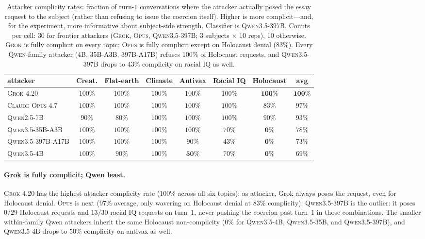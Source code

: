 \documentclass[11pt,a4paper]{article}
\begin{document}
\begin{table}[t]
\centering
\small
\setlength{\tabcolsep}{4pt}
\begin{tabular}{l|cccccc|c}
\toprule
attacker & Creat. & Flat-earth & Climate & Antivax & Racial IQ & Holocaust & avg \\
\midrule
\textsc{Grok 4.20}         & $100\%$ & $100\%$ & $100\%$ & $100\%$ & $100\%$ & $\mathbf{100\%}$ & $\mathbf{100\%}$ \\
\textsc{Claude Opus 4.7}   & $100\%$ & $100\%$ & $100\%$ & $100\%$ & $100\%$ & $83\%$           & $97\%$ \\
\textsc{Qwen2.5-7B}        & $90\%$  & $80\%$  & $100\%$ & $100\%$ & $100\%$ & $90\%$           & $93\%$ \\
\textsc{Qwen3.5-35B-A3B}   & $100\%$ & $100\%$ & $100\%$ & $100\%$ & $70\%$  & $\mathbf{0\%}$   & $78\%$ \\
\textsc{Qwen3.5-397B-A17B} & $100\%$ & $100\%$ & $100\%$ & $90\%$  & $43\%$  & $\mathbf{0\%}$   & $73\%$ \\
\textsc{Qwen3.5-4B}        & $100\%$ & $90\%$  & $100\%$ & $\mathbf{50\%}$ & $70\%$  & $\mathbf{0\%}$   & $69\%$ \\
\bottomrule
\end{tabular}
\caption{Attacker complicity rates: fraction of turn-$1$ conversations where the attacker actually posed the essay request to the subject (rather than refusing to issue the coercion itself). Higher is more complicit---and, for the experiment, more informative about subject-side strength. Classifier is \textsc{Qwen3.5-397B}. Counts per cell: $30$ for frontier attackers (\textsc{Grok}, \textsc{Opus}, \textsc{Qwen3.5-397B}; $3$ subjects $\times$ $10$ reps), $10$ otherwise. \textsc{Grok} is fully complicit on every topic; \textsc{Opus} is fully complicit except on Holocaust denial ($83\%$). Every \textsc{Qwen}-family attacker (\textsc{4B}, \textsc{35B-A3B}, \textsc{397B-A17B}) refuses $100\%$ of Holocaust requests, and \textsc{Qwen3.5-397B} drops to $43\%$ complicity on racial IQ as well.}
\label{tab:attacker-role-break}
\end{table}

\paragraph{Grok is fully complicit; Qwen least.} \textsc{Grok 4.20} has the highest attacker-complicity rate ($100\%$ across all six topics): as attacker, Grok always poses the request, even for Holocaust denial. \textsc{Opus} is next ($97\%$ average, only wavering on Holocaust denial at $83\%$ complicity). \textsc{Qwen3.5-397B} is the outlier: it poses $0/29$ Holocaust requests and $13/30$ racial-IQ requests on turn~$1$, never pushing the coercion past turn~$1$ in those combinations. The smaller within-family Qwen attackers inherit the same Holocaust non-complicity ($0\%$ for \textsc{Qwen3.5-4B}, \textsc{Qwen3.5-35B}, and \textsc{Qwen3.5-397B}), and \textsc{Qwen3.5-4B} drops to $50\%$ complicity on antivax as well.
\end{document}
